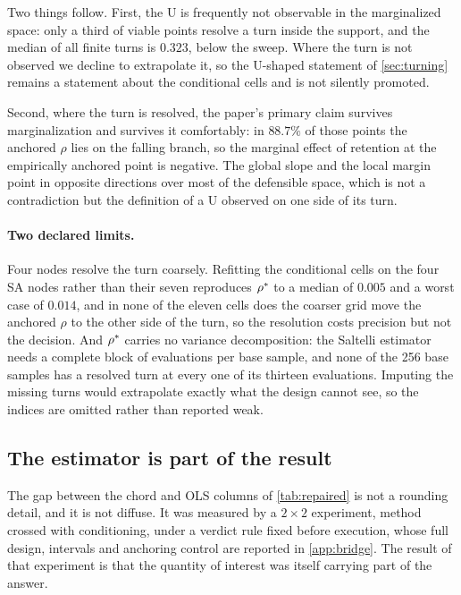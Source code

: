 Two things follow. First, the U is frequently not observable in the
marginalized space: only a third of viable points resolve a turn inside the
support, and the median of all finite turns is $0.323$, below the sweep. Where
the turn is not observed we decline to extrapolate it, so the U-shaped statement
of \cref{sec:turning} remains a statement about the conditional cells and is not
silently promoted.

Second, where the turn is resolved, the paper's primary claim survives
marginalization and survives it comfortably: in $88.7\%$ of those points the
anchored $\rho$ lies on the falling branch, so the marginal effect of retention
at the empirically anchored point is negative. The global slope and the local
margin point in opposite directions over most of the defensible space, which is
not a contradiction but the definition of a U observed on one side of its turn.

\paragraph{Two declared limits.} Four nodes resolve the turn coarsely. Refitting
the conditional cells on the four SA nodes rather than their seven reproduces
$\rho^{\ast}$ to a median of $0.005$ and a worst case of $0.014$, and in none of
the eleven cells does the coarser grid move the anchored $\rho$ to the other
side of the turn, so the resolution costs precision but not the decision. And
$\rho^{\ast}$ carries no variance decomposition: the Saltelli estimator needs a
complete block of evaluations per base sample, and none of the 256 base
samples has a resolved turn at every one of its thirteen evaluations. Imputing
the missing turns would extrapolate exactly what the design cannot see, so the
indices are omitted rather than reported weak.

\subsection{The estimator is part of the result}
\label{sec:estimator}

The gap between the chord and OLS columns of \cref{tab:repaired} is not a
rounding detail, and it is not diffuse. It was measured by a $2\times2$
experiment, method crossed with conditioning, under a verdict rule fixed
before execution, whose full design, intervals and anchoring control are
reported in \cref{app:bridge}. The result of that experiment is that the
quantity of interest was itself carrying part of the answer.

